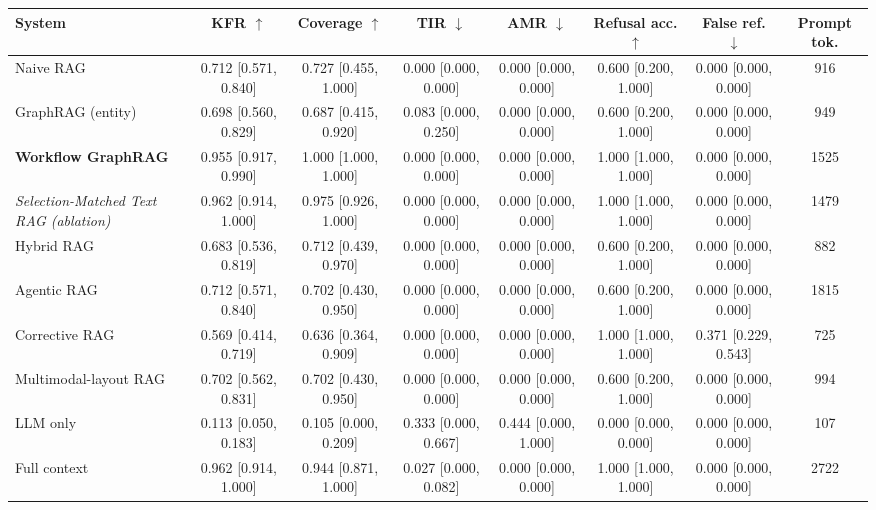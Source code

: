 \begin{tabular}{lccccccc}
\toprule
System & KFR $\uparrow$ & Coverage $\uparrow$ & TIR $\downarrow$ & AMR $\downarrow$ & Refusal acc. $\uparrow$ & False ref. $\downarrow$ & Prompt tok. \\
\midrule
Naive RAG & 0.712 [0.571, 0.840] & 0.727 [0.455, 1.000] & 0.000 [0.000, 0.000] & 0.000 [0.000, 0.000] & 0.600 [0.200, 1.000] & 0.000 [0.000, 0.000] & 916 \\
GraphRAG (entity) & 0.698 [0.560, 0.829] & 0.687 [0.415, 0.920] & 0.083 [0.000, 0.250] & 0.000 [0.000, 0.000] & 0.600 [0.200, 1.000] & 0.000 [0.000, 0.000] & 949 \\
\textbf{Workflow GraphRAG} & 0.955 [0.917, 0.990] & 1.000 [1.000, 1.000] & 0.000 [0.000, 0.000] & 0.000 [0.000, 0.000] & 1.000 [1.000, 1.000] & 0.000 [0.000, 0.000] & 1525 \\
\textit{Selection-Matched Text RAG (ablation)} & 0.962 [0.914, 1.000] & 0.975 [0.926, 1.000] & 0.000 [0.000, 0.000] & 0.000 [0.000, 0.000] & 1.000 [1.000, 1.000] & 0.000 [0.000, 0.000] & 1479 \\
\midrule
Hybrid RAG & 0.683 [0.536, 0.819] & 0.712 [0.439, 0.970] & 0.000 [0.000, 0.000] & 0.000 [0.000, 0.000] & 0.600 [0.200, 1.000] & 0.000 [0.000, 0.000] & 882 \\
Agentic RAG & 0.712 [0.571, 0.840] & 0.702 [0.430, 0.950] & 0.000 [0.000, 0.000] & 0.000 [0.000, 0.000] & 0.600 [0.200, 1.000] & 0.000 [0.000, 0.000] & 1815 \\
Corrective RAG & 0.569 [0.414, 0.719] & 0.636 [0.364, 0.909] & 0.000 [0.000, 0.000] & 0.000 [0.000, 0.000] & 1.000 [1.000, 1.000] & 0.371 [0.229, 0.543] & 725 \\
Multimodal-layout RAG & 0.702 [0.562, 0.831] & 0.702 [0.430, 0.950] & 0.000 [0.000, 0.000] & 0.000 [0.000, 0.000] & 0.600 [0.200, 1.000] & 0.000 [0.000, 0.000] & 994 \\
\midrule
LLM only & 0.113 [0.050, 0.183] & 0.105 [0.000, 0.209] & 0.333 [0.000, 0.667] & 0.444 [0.000, 1.000] & 0.000 [0.000, 0.000] & 0.000 [0.000, 0.000] & 107 \\
Full context & 0.962 [0.914, 1.000] & 0.944 [0.871, 1.000] & 0.027 [0.000, 0.082] & 0.000 [0.000, 0.000] & 1.000 [1.000, 1.000] & 0.000 [0.000, 0.000] & 2722 \\
\bottomrule
\end{tabular}
